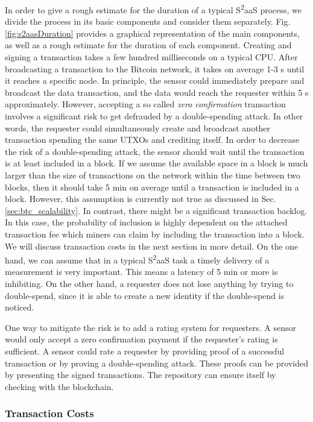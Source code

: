 In order to give a rough estimate for the duration of a typical S\textsuperscript{2}aaS process, we divide the process in its basic components and consider them separately. Fig. \ref{fig:s2aasDuration} provides a graphical representation of the main components, as well as a rough estimate for the duration of each component. Creating and signing a transaction takes a few hundred milliseconds on a typical CPU. After broadcasting a transaction to the Bitcoin network, it takes on average 1-3 s until it reaches a specific node. In principle, the sensor could immediately prepare and broadcast the data transaction, and the data would reach the requester within 5 s approximately. However, accepting a so called \emph{zero confirmation} transaction involves a significant risk to get defrauded by a double-spending attack. In other words, the requester could simultaneously create and broadcast another transaction spending the same \ac{UTXO}s and crediting itself.
In order to decrease the risk of a double-spending attack, the sensor should wait until the transaction is at least included in a block. If we assume the available space in a block is much larger than the size of transactions on the network within the time between two blocks, then it should take 5 min on average until a transaction is included in a block. However, this assumption is currently not true as discussed in Sec. \ref{sec:btc_scalability}. In contrast, there might be a significant transaction backlog. In this case, the probability of inclusion is highly dependent on the attached transaction fee which miners can claim by including the transaction into a block. We will discuss transaction costs in the next section in more detail.
On the one hand, we can assume that in a typical S\textsuperscript{2}aaS task a timely delivery of a measurement is very important. This means a latency of 5 min or more is inhibiting. On the other hand, a requester does not lose anything by trying to double-spend, since it is able to create a new identity if the double-spend is noticed. 

One way to mitigate the risk is to add a rating system for requesters. A sensor would only accept a zero confirmation payment if the requester's rating is sufficient. A sensor could rate a requester by providing proof of a successful transaction or by proving a double-spending attack. These proofs can be provided by presenting the signed transactions. The repository can ensure itself by checking with the blockchain. 

\subsubsection{Transaction Costs}
\label{sec:s2aas_eval_tc}

